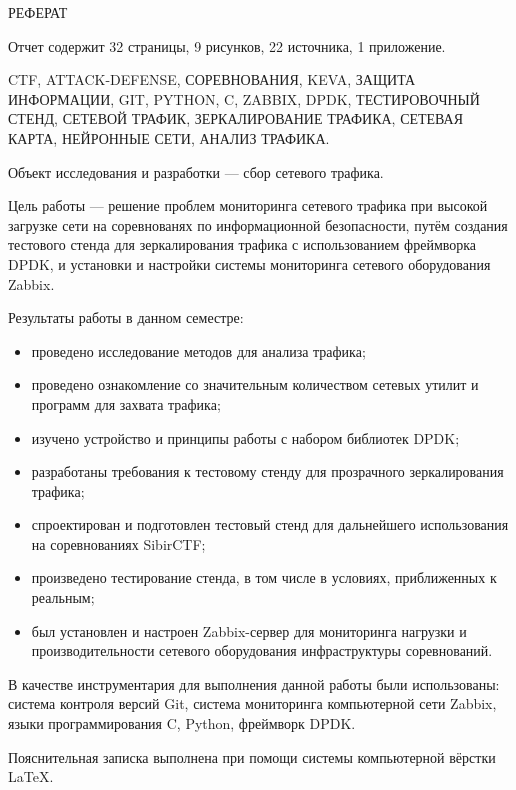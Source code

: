 \begin{center}
РЕФЕРАТ
\end{center}

Отчет содержит 32 страницы, 9 рисунков, 22 источника, 1 приложение.\par 

CTF, ATTACK-DEFENSE, СОРЕВНОВАНИЯ, KEVA, ЗАЩИТА ИНФОРМАЦИИ,  GIT, PYTHON, C, ZABBIX, DPDK, ТЕСТИРОВОЧНЫЙ СТЕНД, СЕТЕВОЙ ТРАФИК, ЗЕРКАЛИРОВАНИЕ ТРАФИКА, СЕТЕВАЯ КАРТА, НЕЙРОННЫЕ СЕТИ, АНАЛИЗ ТРАФИКА.\par 

Объект исследования и разработки --- сбор сетевого трафика.\par 

Цель работы — решение проблем мониторинга сетевого трафика при высокой загрузке сети на соревнованях по информационной безопасности, путём создания тестового стенда для зеркалирования трафика с использованием фреймворка DPDK, и установки и настройки системы мониторинга сетевого оборудования Zabbix.\par

Результаты работы в данном семестре:
\begin{itemize}
\item проведено исследование методов для анализа трафика;
\item проведено ознакомление со значительным количеством сетевых утилит и программ для захвата трафика;
\item изучено устройство и принципы работы с набором библиотек DPDK;
\item разработаны требования к тестовому стенду для прозрачного зеркалирования трафика;
\item спроектирован и подготовлен тестовый стенд для дальнейшего использования на соревнованиях SibirCTF;
\item произведено тестирование стенда, в том числе в условиях, приближенных к реальным;
\item был установлен и настроен Zabbix-сервер для мониторинга нагрузки и производительности сетевого оборудования инфраструктуры соревнований.
\end{itemize} 

В качестве инструментария для выполнения данной работы были использованы: система контроля версий Git, система мониторинга компьютерной сети Zabbix, языки программирования C, Python, фреймворк DPDK.\par

Пояснительная записка выполнена при помощи системы компьютерной вёрстки \LaTeX.

